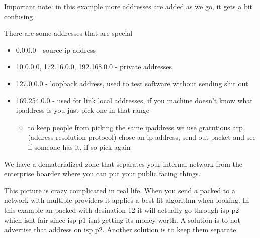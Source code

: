 \documentclass[12pt]{article}
\begin{document}
Important note: in this example more addresses are added as we go, it gets a bit confusing.


There are some addresses that are special

\begin{itemize}
  \item 0.0.0.0 - source ip address
  \item 10.0.0.0, 172.16.0.0, 192.168.0.0 - private addresses
  \item 127.0.0.0 - loopback address, used to test software without sending shit out
  \item 169.254.0.0 - used for link local addresses, if you machine doesn't know what ipaddress is you just pick one in that range
  \begin{itemize}
    \item to keep people from picking the same ipaddress we use gratutious arp (address resolution protocol) chose an ip address, send out packet and see if someone has it, if so pick again
  \end{itemize}
\end{itemize}




We have a dematerialized zone that separates your internal network from the enterprise boarder where you can put your public facing things. 


This picture is crazy complicated in real life. When you send a packed to a network with multiple providers it applies a best fit algorithm when looking. In this example an packed with desination 12 it will actually go through isp p2 which isnt fair since isp p1 isnt getting its money worth. A solution is to not advertise that address on isp p2. Another solution is to keep them separate.
\end{document}
